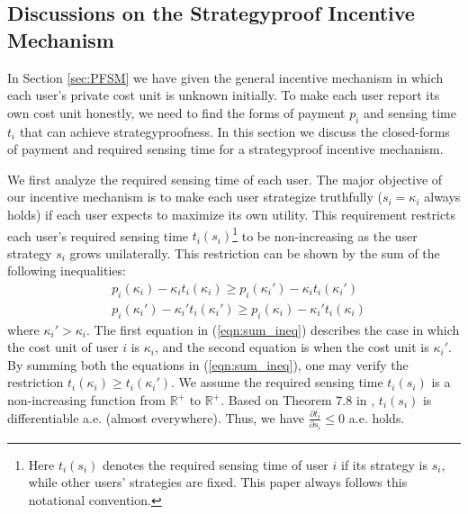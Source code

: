 \documentclass[conference]{IEEEtran}
\theoremstyle{definition}
\begin{document}



\appendix
{\color{black}
\subsection{Discussions on the Strategyproof Incentive Mechanism}
\label{sec:dsim}
In Section \ref{sec:PFSM} we have given the general incentive mechanism in which each user's private cost unit is unknown initially. To make each user report its own cost unit honestly, we need to find the forms of payment $p_i$ and sensing time $t_i$ that can achieve strategyproofness. In this section we discuss the closed-forms of payment and required sensing time for a strategyproof incentive mechanism.

We first analyze the required sensing time of each user. The major objective of our incentive mechanism is to make each user strategize truthfully ($s_i=\kappa_i$ always holds) if each user expects to maximize its own utility. This requirement restricts each user\rq{}s required sensing time $t_i(s_i)$\footnote{Here $t_i(s_i)$ denotes the required sensing time of user $i$ if its strategy is $s_i$, while other users\rq{} strategies are fixed. This paper always follows this notational convention.} to be non-increasing as the user strategy $s_i$ grows unilaterally. This restriction can be shown by the sum of the following inequalities:
\begin{equation}
\label{eqn:sum_ineq}
\begin{aligned}
&p_i(\kappa_i)-\kappa_it_i(\kappa_i)\geq p_i(\kappa_i')-\kappa_it_i(\kappa_i')\\
&p_i(\kappa_i')-\kappa_i't_i(\kappa_i')\geq p_i(\kappa_i)-\kappa_i't_i(\kappa_i)
\end{aligned}
\end{equation}
where $\kappa_i'>\kappa_i$. The first equation in (\ref{eqn:sum_ineq}) describes the case in which the cost unit of user $i$ is $\kappa_i$, and the second equation is when the cost unit is $\kappa_i'$. By summing both the equations in (\ref{eqn:sum_ineq}), one may verify the restriction $t_i(\kappa_i)\geq t_i(\kappa_i')$. We assume the required sensing time $t_i(s_i)$ is a non-increasing function from $\mathbb{R}^+$ to $\mathbb{R}^+$. Based on Theorem 7.8 in \cite{oxtoby1971measure}, $t_i(s_i)$ is differentiable a.e. (almost everywhere). Thus, we have $\frac{\partial t_i}{\partial s_i}\leq 0$ a.e. holds.

}
\end{document}
